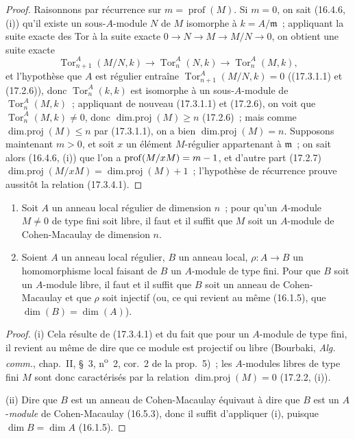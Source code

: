 \begin{proof}
Raisonnons par récurrence sur $m=\operatorname{prof}(M)$. Si $m=0$, on sait
(16.4.6, (i)) qu'il existe un sous-$A$-module $N$ de $M$ isomorphe à
$k=A/\mathfrak{m}$~; appliquant la suite exacte des Tor à la suite exacte
$0\longrightarrow N\longrightarrow M\longrightarrow M/N\longrightarrow0$,
on obtient une suite exacte
\[
  \operatorname{Tor}^A_{n+1}(M/N,k)\longrightarrow
  \operatorname{Tor}^A_n(N,k)\longrightarrow
  \operatorname{Tor}^A_n(M,k),
\]
et l'hypothèse que $A$ est régulier entraîne
$\operatorname{Tor}^A_{n+1}(M/N,k)=0$ ((17.3.1.1) et (17.2.6)), donc
$\operatorname{Tor}^A_n(k,k)$ est isomorphe à un sous-$A$-module de
$\operatorname{Tor}^A_n(M,k)$~; appliquant de nouveau (17.3.1.1) et (17.2.6),
on voit que $\operatorname{Tor}^A_n(M,k)\neq0$, donc
$\operatorname{dim.proj}(M)\geq n$ (17.2.6)~; mais comme
$\operatorname{dim.proj}(M)\leq n$ par (17.3.1.1), on a bien
$\operatorname{dim.proj}(M)=n$.
Supposons maintenant $m>0$, et soit $x$ un élément $M$-régulier appartenant à
$\mathfrak{m}$~; on sait alors (16.4.6, (i)) que l'on a
$\operatorname{prof}(M/xM)=m- 1$, et d'autre part (17.2.7)
$\operatorname{dim.proj}(M/xM)=\operatorname{dim.proj}(M)+1$~; l'hypothèse de
récurrence prouve aussitôt la relation (17.3.4.1).
\end{proof}


\begin{corollary}[17.3.5]
\label{0.17.3.5-fr}
\begin{enumerate}
  \item[\rm(i)] Soit $A$ un anneau local régulier de dimension $n$~; pour
  qu'un $A$-module $M\neq0$ de type fini soit libre, il faut et il suffit que
  $M$ soit un $A$-module de Cohen-Macaulay de dimension $n$.
  \item[\rm(ii)] Soient $A$ un anneau local régulier, $B$ un anneau local,
  $\rho:A\to B$ un homomorphisme local faisant de $B$ un $A$-module de type
  fini. Pour que $B$ soit un $A$-module libre, il faut et il suffit que $B$
  soit un anneau de Cohen-Macaulay et que $\rho$ soit injectif \textup{(ou, ce qui
  revient au même (16.1.5), que $\dim(B)=\dim(A)$)}.
\end{enumerate}
\end{corollary}

\begin{proof}
(i) Cela résulte de (17.3.4.1) et du fait que pour un $A$-module de type fini,
il revient au même de dire que ce module est projectif ou libre (Bourbaki,
\emph{Alg. comm.}, chap.~II, \S~3, n\textsuperscript{o}~2, cor.~2 de la
prop.~5)~; les $A$-modules libres de type fini $M$ sont donc caractérisés par
la relation $\operatorname{dim.proj}(M)=0$ (17.2.2, (i)).

(ii) Dire que $B$ est un anneau de Cohen-Macaulay équivaut à dire que $B$ est
un $A$-\emph{module} de Cohen-Macaulay (16.5.3), donc il suffit d'appliquer (i),
puisque $\dim B=\dim A$ (16.1.5).
\end{proof}

